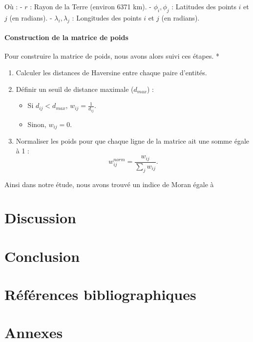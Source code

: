 \documentclass[
]{article}
\providecommand{\tightlist}{%
  \setlength{\itemsep}{0pt}\setlength{\parskip}{0pt}}
\begin{document}
Où : - \(r\) : Rayon de la Terre (environ 6371 km). - \(\phi_i, \phi_j\)
: Latitudes des points \(i\) et \(j\) (en radians). -
\(\lambda_i, \lambda_j\) : Longitudes des points \(i\) et \(j\) (en
radians).

\paragraph{Construction de la matrice de
poids}\label{construction-de-la-matrice-de-poids}

Pour construire la matrice de poids, nous avons alors suivi ces étapes.
*

\begin{enumerate}
\def\labelenumi{\arabic{enumi}.}
\tightlist
\item
  Calculer les distances de Haversine entre chaque paire d'entités.
\item
  Définir un seuil de distance maximale (\(d_{max}\)) :

  \begin{itemize}
  \tightlist
  \item
    Si \(d_{ij} < d_{max}\), \(w_{ij} = \frac{1}{d_{ij}}\).
  \item
    Sinon, \(w_{ij} = 0\).
  \end{itemize}
\item
  Normaliser les poids pour que chaque ligne de la matrice ait une somme
  égale à 1 : \[
   w_{ij}^{norm} = \frac{w_{ij}}{\sum_{j} w_{ij}}.
  \]
\end{enumerate}

Ainsi dans notre étude, nous avons trouvé un indice de Moran égale à

\section{Discussion}\label{discussion}

\section{Conclusion}\label{conclusion}

\section{Références
bibliographiques}\label{ruxe9fuxe9rences-bibliographiques}

\section{Annexes}\label{annexes}
\end{document}
